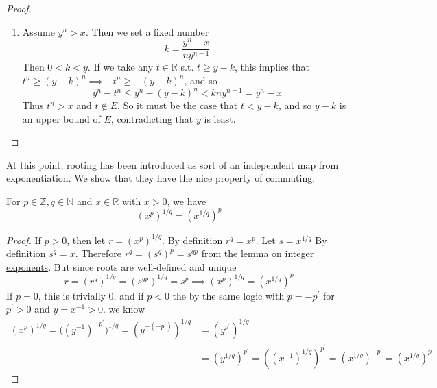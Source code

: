 \begin{proof}
\begin{enumerate}
      \item Assume $y^n > x$. Then we set a fixed number 
      \begin{equation}
        k = \frac{y^n - x}{n y^{n-1}} 
      \end{equation}
      Then $0 < k < y$. If we take any $t \in \mathbb{R}$ s.t. $t \geq y - k$, this implies that $t^n \geq (y -k)^n \implies -t^n \geq -(y - k)^n$, and so 
      \begin{equation}
        y^n - t^n \leq y^n - (y - k)^n < k ny^{n-1} = y^n - x
      \end{equation}
      Thus $t^n > x$ and $t \not\in E$. So it must be the case that $t < y - k$, and so $y - k$ is an upper bound of $E$, contradicting that $y$ is least. 
    \end{enumerate}
  \end{proof}

  At this point, rooting has been introduced as sort of an independent map from exponentiation. We show that they have the nice property of commuting. 

  \begin{lemma}
    \label{thm:rooting-and-exponentiation-commute}
    For $p \in \mathbb{Z}, q \in \mathbb{N}$ and $x \in \mathbb{R}$ with $x > 0$, we have 
    \begin{equation}
      (x^{p})^{1/q} = (x^{1/q})^p
    \end{equation}
  \end{lemma}
  \begin{proof}
    If $p > 0$, then let $r = (x^p)^{1/q}$. By definition $r^q = x^p$. Let $s = x^{1/q}$ By definition $s^q = x$. Therefore $r^q = (s^q)^p = s^{qp}$ from the lemma on \hyperref[thm:integer-exponents]{integer exponents}. But since roots are well-defined and unique 
    \begin{equation}
      r = (r^q)^{1/q} = (s^{qp})^{1/q} = s^p \implies (x^p)^{1/q} = (x^{1/q})^p
    \end{equation}
    If $p = 0$, this is trivially $0$, and if $p < 0$ the by the same logic with $p = -p^\prime$ for $p^\prime > 0$ and $y = x^{-1} > 0$. we know 
    \begin{align}
      (x^p)^{1/q} = \big( (y^{-1})^{-p^\prime} \big)^{1/q} = (y^{-(-p^\prime)})^{1/q} & = (y^{p^\prime})^{1/q} \\ 
                         & = (y^{1/q})^{p^\prime} = ((x^{-1})^{1/q})^{p^\prime} = (x^{1/q})^{-p^\prime} = (x^{1/q})^p
    \end{align}
  \end{proof}


